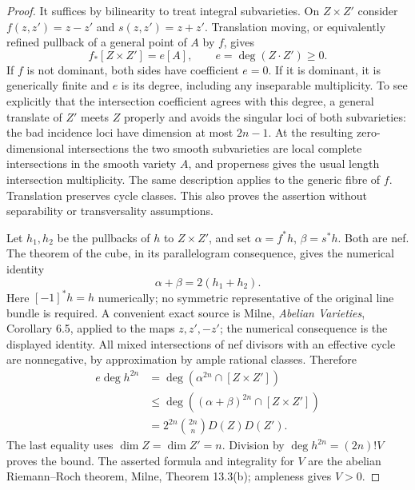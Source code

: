 \documentclass[11pt]{article}
\theoremstyle{remark}\newtheorem{remark}[theorem]{Remark}
\begin{document}
\begin{proof}
It suffices by bilinearity to treat integral subvarieties.  On
$Z\times Z'$ consider $f(z,z')=z-z'$ and $s(z,z')=z+z'$.  Translation
moving, or equivalently refined pullback of a general point of $A$ by
$f$, gives
\[
 f_*[Z\times Z']=e[A],\qquad e=\deg(Z\cdot Z')\geq0.
\]
If $f$ is not dominant, both sides have coefficient $e=0$.  If it is
dominant, it is generically finite and $e$ is its degree, including any
inseparable multiplicity.  To see explicitly that the intersection
coefficient agrees with this degree, a general translate of $Z'$ meets
$Z$ properly and avoids the singular loci of both subvarieties: the
bad incidence loci have dimension at most $2n-1$.  At the resulting
zero-dimensional intersections the two smooth subvarieties are local
complete intersections in the smooth variety $A$, and properness gives
the usual length intersection multiplicity.  The same description
applies to the generic fibre of $f$.  Translation preserves cycle
classes.  This also proves the assertion without separability or
transversality assumptions.

Let $h_1,h_2$ be the pullbacks of $h$ to $Z\times Z'$, and set
$\alpha=f^*h$, $\beta=s^*h$.  Both are nef.  The theorem of the cube,
in its parallelogram consequence, gives the numerical identity
\[
 \alpha+\beta=2(h_1+h_2).
\]
Here $[-1]^*h=h$ numerically; no symmetric representative of the
original line bundle is required.  A convenient exact source is
Milne, \emph{Abelian Varieties}, Corollary 6.5, applied to the maps
$z,z',-z'$; the numerical consequence is the displayed identity.
All mixed intersections of nef divisors with an effective cycle are
nonnegative, by approximation by ample rational classes.  Therefore
\begin{align*}
 e\deg h^{2n}
 &=\deg(\alpha^{2n}\cap[Z\times Z'])\\
 &\leq\deg((\alpha+\beta)^{2n}\cap[Z\times Z'])\\
 &=2^{2n}\binom{2n}{n}D(Z)D(Z').
\end{align*}
The last equality uses $\dim Z=\dim Z'=n$.  Division by
$\deg h^{2n}=(2n)!V$ proves the bound.  The asserted formula and
integrality for $V$ are the abelian Riemann--Roch theorem, Milne,
Theorem 13.3(b); ampleness gives $V>0$.
\end{proof}
\end{document}
